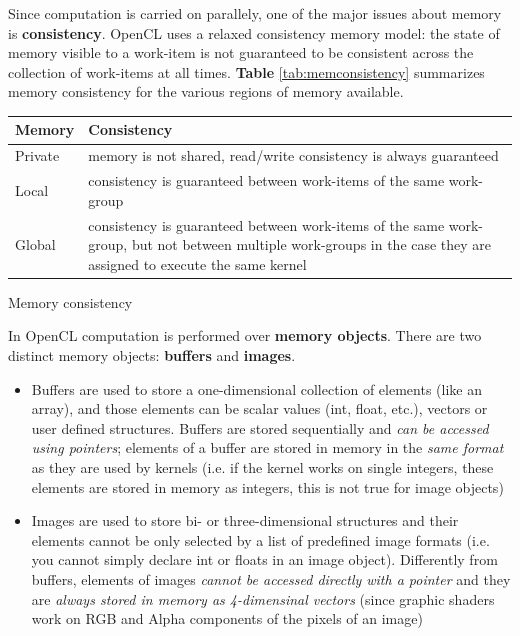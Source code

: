 Since computation is carried on parallely, one of the major issues about memory is \textbf{consistency}. OpenCL uses a relaxed consistency memory model: the state of memory visible to a work-item is not guaranteed to be consistent across the collection of work-items at all times. \textbf{Table} \ref{tab:memconsistency} summarizes memory consistency for the various regions of memory available.\\

\begin{tablehere}
{\footnotesize
\begin{tabular}{|p{2cm}|p{}|} \hline
\textbf{Memory} & \textbf{Consistency}\\ \hline
Private & memory is not shared, read/write consistency is always guaranteed\\ \hline
Local & consistency is guaranteed between work-items of the same work-group\\ \hline
Global & consistency is guaranteed between work-items of the same work-group, but not between multiple work-groups in the case they are assigned to execute the same kernel\\ \hline
\end{tabular}}
\caption{Memory consistency}
\label{tab:memconsistency}
\end{tablehere}


In OpenCL computation is performed over \textbf{memory objects}. There are two distinct memory objects: \textbf{buffers} and \textbf{images}.

\begin{itemize}
	\item Buffers are used to store a one-dimensional collection of elements (like an array), and those elements can be scalar values (int, float, etc.), vectors or user defined structures.
	Buffers are stored sequentially and \emph{can be accessed using pointers}; elements of a buffer are stored in memory in the \emph{same format} as they are used by kernels (i.e. if the kernel works on single integers, these elements are stored in memory as integers, this is not true for image objects)
	\item Images are used to store bi- or three-dimensional structures and their elements cannot be only selected by a list of predefined image formats (i.e. you cannot simply declare int or floats in an image object). Differently from buffers, elements of images \emph{cannot be accessed directly with a pointer} and they are \emph{always stored in memory as 4-dimensinal vectors} (since graphic shaders work on RGB and Alpha components of the pixels of an image)
\end{itemize}

